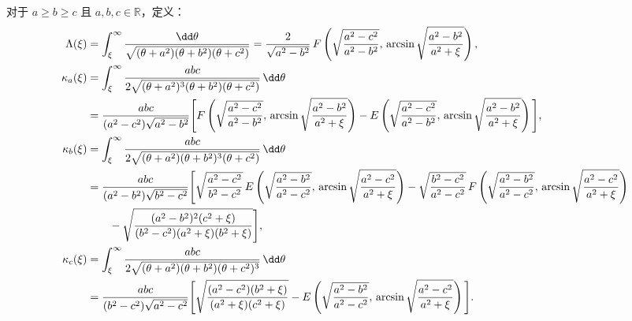 对于 \( a \ge b \ge c \) 且 \( a, b, c \in \mathbb{R} \)，定义：
\small
\begin{align*}
	\Lambda(\xi)
	 & = \int_{\xi}^{\infty} \frac{ \dd  \theta }
	{ \sqrt{ (\theta + a^2)(\theta + b^2)(\theta + c^2) } } = \frac{2}{ \sqrt{a^2 - b^2} } \,
	F\left( \sqrt{ \frac{a^2 - c^2}{a^2 - b^2} },\,
	\arcsin \sqrt{ \frac{a^2 - b^2}{a^2 + \xi} } \right),                                                                \\
	\kappa_a(\xi)
	 & = \int_{\xi}^{\infty} \frac{abc}{2 \sqrt{ (\theta + a^2)^3 (\theta + b^2)(\theta + c^2) } } \, \dd  \theta  \notag \\
	 & = \frac{abc}{(a^2 - c^2) \sqrt{a^2 - b^2}} \Bigg[
		F\left( \sqrt{ \frac{a^2 - c^2}{a^2 - b^2} },\,
		\arcsin \sqrt{ \frac{a^2 - b^2}{a^2 + \xi} } \right) - E\left( \sqrt{ \frac{a^2 - c^2}{a^2 - b^2} },\,
		\arcsin \sqrt{ \frac{a^2 - b^2}{a^2 + \xi} } \right)
	\Bigg],                                                                                                              \\
	\kappa_b(\xi)
	 & = \int_{\xi}^{\infty} \frac{abc}{2 \sqrt{ (\theta + a^2)(\theta + b^2)^3(\theta + c^2) } } \, \dd  \theta  \notag  \\
	 & = \frac{abc}{(a^2 - b^2) \sqrt{b^2 - c^2}} \Bigg[
		\sqrt{ \frac{a^2 - c^2}{b^2 - c^2} } \,
		E\left( \sqrt{ \frac{a^2 - b^2}{a^2 - c^2} },\,
		\arcsin \sqrt{ \frac{a^2 - c^2}{a^2 + \xi} } \right)- \sqrt{ \frac{b^2 - c^2}{a^2 - c^2} } \,
		F\left( \sqrt{ \frac{a^2 - b^2}{a^2 - c^2} },\,
	\arcsin \sqrt{ \frac{a^2 - c^2}{a^2 + \xi} } \right) \notag                                                          \\
	 & \qquad - \sqrt{ \frac{ (a^2 - b^2)^2 (c^2 + \xi) }{ (b^2 - c^2)(a^2 + \xi)(b^2 + \xi) } }
	\Bigg],                                                                                                              \\
	\kappa_c(\xi)
	 & = \int_{\xi}^{\infty} \frac{abc}{2 \sqrt{ (\theta + a^2)(\theta + b^2)(\theta + c^2)^3 } } \, \dd  \theta \notag   \\
	 & = \frac{abc}{(b^2 - c^2) \sqrt{a^2 - c^2}} \Bigg[
		\sqrt{ \frac{(a^2 - c^2)(b^2 + \xi)}{(a^2 + \xi)(c^2 + \xi)} } - E\left( \sqrt{ \frac{a^2 - b^2}{a^2 - c^2} },\,
		\arcsin \sqrt{ \frac{a^2 - c^2}{a^2 + \xi} } \right)
		\Bigg].
\end{align*}
\normalsize

